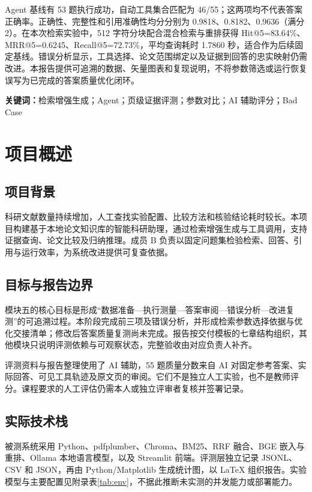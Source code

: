 \documentclass[UTF8,a4paper,zihao=-4,fontset=none]{ctexart}
\begin{document}
Agent 基线有 53 题执行成功，自动工具集合匹配为 46/55；这两项均不代表答案正确率。正确性、完整性和引用准确性均分分别为 0.9818、0.8182、0.9636（满分 2）。在本次检索实验中，512 字符分块配合混合检索与重排获得 Hit@5=83.64\%、MRR@5=0.6245、Recall@5=72.73\%，平均查询耗时 1.7860 秒，适合作为后续固定基线。错误分析显示，工具选择、论文范围绑定以及证据到回答的忠实映射仍需改进。本报告提供可追溯的数据、矢量图表和复现说明，不将参数筛选或运行恢复误写为已完成的答案质量优化闭环。

\noindent\textbf{关键词：}检索增强生成；Agent；页级证据评测；参数对比；AI 辅助评分；Bad Case
\clearpage
{\tableofcontents}
\clearpage
{}

\section{项目概述}
\subsection{项目背景}
科研文献数量持续增加，人工查找实验配置、比较方法和核验结论耗时较长。本项目构建基于本地论文知识库的智能科研助理，通过检索增强生成与工具调用，支持证据查询、论文比较及归纳推理。成员 B 负责以固定问题集检验检索、回答、引用与运行效率，为系统改进提供可复查依据。

\subsection{目标与报告边界}
模块五的核心目标是形成“数据准备—执行测量—答案审阅—错误分析—改进复测”的可追溯过程。本阶段完成前三项及错误分析，并形成检索参数选择依据与优化交接清单；修改后答案质量复测尚未完成。报告按交付模板的七章结构组织，其他模块只说明评测依赖与可观察状态，完整验收由对应负责人补齐。

评测资料与报告整理使用了 AI 辅助，55 题质量分数来自 AI 对固定参考答案、实际回答、可见工具轨迹及原文页的审阅。它们不是独立人工实验，也不是教师评分。课程要求的人工评估仍需本人或独立评审者复核并签署记录。

\subsection{实际技术栈}
被测系统采用 Python、pdfplumber、Chroma、BM25、RRF 融合、BGE 嵌入与重排、Ollama 本地语言模型，以及 Streamlit 前端。评测层独立记录 JSONL、CSV 和 JSON，再由 Python/Matplotlib 生成统计图，以 LaTeX 组织报告。实验模型与主要配置见附录表\ref{tab:env}，不据此推断未实测的并发能力或部署能力。
\end{document}
